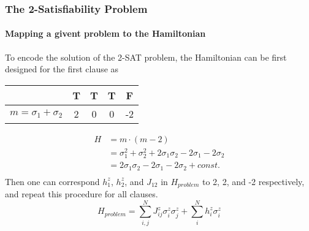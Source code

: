 \documentclass{beamer}
\begin{document}
\begin{frame}
	\frametitle{The 2-Satisfiability Problem}
	\framesubtitle{Mapping a givent problem to the Hamiltonian}
	
	To encode the solution of the 2-SAT problem, the Hamiltonian can be first designed for the first clause as 
	\begin{center}
		\begin{tabular}{|c|c|c|c|c|}
			
			\hline
			& T & T & T & F \\
			\hline
			\hline
			$m=\sigma_1+\sigma_2$ & 2 & 0 & 0 & -2 \\
			\hline
		\end{tabular} 
	\end{center}
	\begin{equation*}
	\begin{split}
	H & = m \cdot (m-2)\\
	& = \sigma_1^2 + \sigma_2^2 + 2\sigma_1 \sigma_2 -2\sigma_1 -2\sigma_2\\
	& = 2\sigma_1 \sigma_2 -2\sigma_1 -2\sigma_2 + const.\\
	\end{split}
	\end{equation*}
	Then one can correspond $h_1^z$, $h_2^z$, and $J_{12}$ in $H_{problem}$ to 2, 2, and -2 respectively, and repeat this procedure for all clauses. 
	\begin{equation*}
	H_{problem}= \sum_{i,j}^N J_{ij}^z \sigma^z_i \sigma^z_j + \sum_{i}^N h_i^z \sigma^z_i
	\end{equation*} 
	
	
\end{frame}

\end{document}
